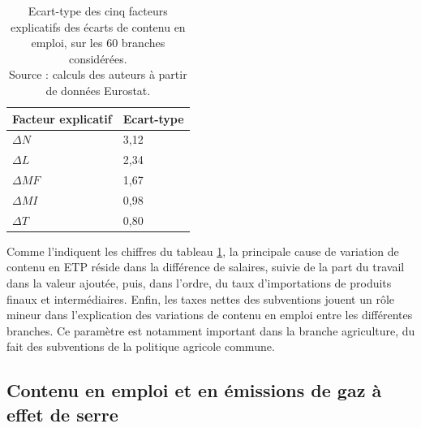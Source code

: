 \begin{table}[!h]
	\centering
	\caption{Ecart-type des cinq facteurs explicatifs des écarts de contenu en emploi, 
		sur les 60 branches considérées. \\ 
		Source : calculs des auteurs à partir de données Eurostat.}
	\label{tab:ecart_type}
	\begin{tabular}{ll}
		\toprule
		Facteur explicatif & Ecart-type \\
		\midrule
		$\Delta N$ & 3,12 \\
		$\Delta L$ & 2,34 \\
		$\Delta MF$ & 1,67 \\
		$\Delta MI$ & 0,98 \\
		$\Delta T$ & 0,80 \\
		\bottomrule
	\end{tabular}
\end{table}


Comme l’indiquent les chiffres du tableau \ref{tab:ecart_type}, la principale cause de variation de contenu en ETP réside dans la différence de salaires, suivie de la part du travail dans la valeur ajoutée, puis, dans l’ordre, du taux d’importations de produits finaux et intermédiaires. Enfin, les taxes nettes des subventions jouent un rôle mineur dans l’explication des variations de contenu en emploi entre les différentes branches. Ce paramètre est notamment important dans la branche agriculture, du fait des subventions de la politique agricole commune.


\subsection{Contenu en emploi et en émissions de gaz à effet de serre}

